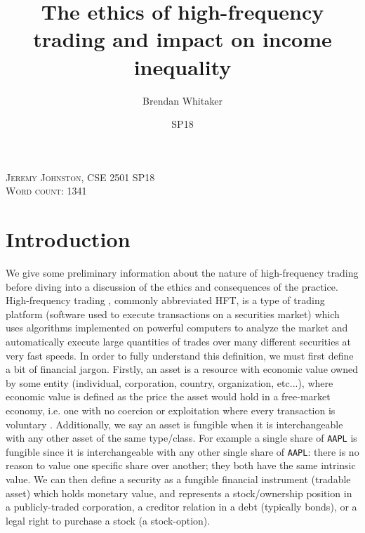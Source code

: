 \documentclass[12pt,oneside,reqno]{amsart}
\theoremstyle{plain}
\theoremstyle{definition}
\theoremstyle{remark}
\newcommand{\inlinecode}{\texttt}
\begin{document}



\title{The ethics of high-frequency trading and impact on income inequality}
\date{SP18}
\author[Brendan Whitaker]{Brendan Whitaker}

\maketitle
\begin{center}
\textsc{Jeremy Johnston, CSE 2501 SP18}\\
\textsc{Word count: 1341}
\end{center}


\section{Introduction}

We give some preliminary information about the nature of high-frequency trading before diving into a discussion of the ethics and consequences of the practice. High-frequency trading \cite{hft}, commonly abbreviated HFT, is a type of trading platform (software used to execute transactions on a securities market) which uses algorithms implemented on powerful computers to analyze the market and automatically execute large quantities of trades over many different securities at very fast speeds. In order to fully understand this definition, we must first define a bit of financial jargon. Firstly, an asset \cite{asset} is a resource with economic value \cite{fontinelle_2015} owned by some entity (individual, corporation, country, organization, etc...), where economic value is defined as the price the asset would hold in a free-market economy, i.e. one with no coercion or exploitation where every transaction is voluntary \cite{freemarket}. Additionally, we say an asset is fungible \cite{fungible} when it is interchangeable with any other asset of the same type/class. For example a single share of \inlinecode{AAPL} is fungible since it is interchangeable with any other single share of \inlinecode{AAPL}: there is no reason to value one specific share over another; they both have the same intrinsic value. We can then define a security \cite{security} as a fungible financial instrument (tradable asset) which holds monetary value, and represents a stock/ownership position in a publicly-traded corporation, a creditor relation in a debt (typically bonds), or a legal right to purchase a stock (a stock-option). 
\end{document}
